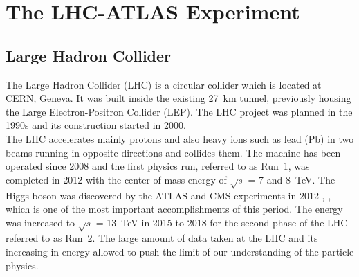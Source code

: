 \chapter{The LHC-ATLAS Experiment}
\label{chap:LHCATLAS}
\section{Large Hadron Collider}
The Large Hadron Collider (LHC) is a circular collider which is located at CERN, Geneva. It was built inside the existing 27~km tunnel, previously housing the Large Electron-Positron Collider (LEP). The LHC project was planned in the 1990s and its construction started in 2000. \\
The LHC accelerates mainly protons and also heavy ions such as lead (Pb) in two beams running in opposite directions and collides them. 
The machine has been operated since 2008 and the first physics run, referred to as Run~1, was completed in 2012 with the center-of-mass energy of $\sqrt{s}$ = 7 and 8~TeV. The Higgs boson was discovered by the ATLAS and CMS experiments in 2012 \cite{HIGG-2012-27}, \cite{CMS-HIG-12-028}, which is one of the most important accomplishments of this period. The energy was increased to $\sqrt{s}$ = 13~TeV in 2015 to 2018 for the second phase of the LHC referred to as Run~2. 
The large amount of data taken at the LHC and its increasing in energy allowed to push the limit of our understanding of the particle physics. 


